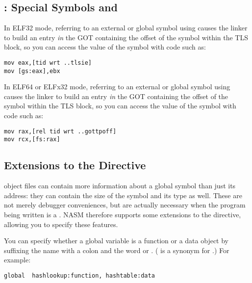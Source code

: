 \subsection{:
 Special Symbols and }
\label{subsec:elftls}

In ELF32 mode, referring to an external or global symbol using
 causes the linker to build
an entry \emph{in} the GOT containing the
offset of the symbol within the TLS block, so you can access the value
of the symbol with code such as:

\begin{lstlisting}
mov eax,[tid wrt ..tlsie]
mov [gs:eax],ebx
\end{lstlisting}

In ELF64 or ELFx32 mode, referring to an external or global symbol using
 causes the linker to build an
entry \emph{in} the GOT containing the offset of the symbol within the TLS
block, so you can access the value of the symbol with code such as:

\begin{lstlisting}
mov rax,[rel tid wrt ..gottpoff]
mov rcx,[fs:rax]
\end{lstlisting}

\subsection{ Extensions to the  Directive}
\label{subsec:elfglob}

 object files can contain more information about a global symbol
than just its address: they can contain the 
size of the symbol and its 
type as well. These are not merely debugger conveniences,
but are actually necessary when the program being written is a
. NASM therefore supports some extensions to the
 directive, allowing you to specify these features.

You can specify whether a global variable is a function or a data
object by suffixing the name with a colon and the word
 or . ( is
a synonym for .) For example:

\begin{lstlisting}
global  hashlookup:function, hashtable:data
\end{lstlisting}

